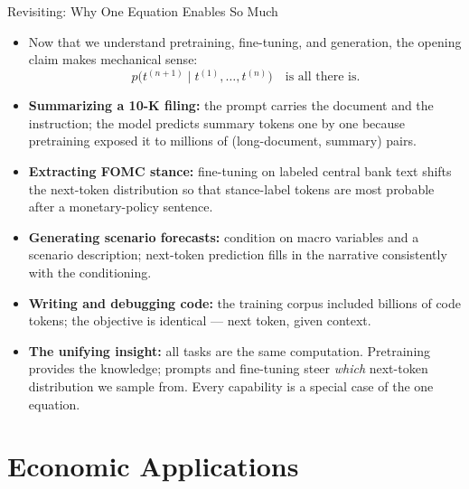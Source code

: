 \documentclass[10pt,english,aspectratio=169]{beamer}
\begin{document}
\begin{frame}{Revisiting: Why One Equation Enables So Much}
\begin{itemize}
\item Now that we understand pretraining, fine-tuning, and generation, the opening claim makes mechanical sense:
\[
   p\bigl(t^{(n+1)} \mid t^{(1)}, \ldots, t^{(n)}\bigr) \quad \text{is all there is.}
\]

\medskip
\item \textbf{Summarizing a 10-K filing:} the prompt carries the document and the instruction; the model predicts summary tokens one by one because pretraining exposed it to millions of (long-document, summary) pairs.

\medskip
\item \textbf{Extracting FOMC stance:} fine-tuning on labeled central bank text shifts the next-token distribution so that stance-label tokens are most probable after a monetary-policy sentence.

\medskip
\item \textbf{Generating scenario forecasts:} condition on macro variables and a scenario description; next-token prediction fills in the narrative consistently with the conditioning.

\medskip
\item \textbf{Writing and debugging code:} the training corpus included billions of code tokens; the objective is identical --- next token, given context.

\medskip
\item \textbf{The unifying insight:} all tasks are the same computation. Pretraining provides the knowledge; prompts and fine-tuning steer \emph{which} next-token distribution we sample from. Every capability is a special case of the one equation.
\end{itemize}
\end{frame}

\section{Economic Applications}
\end{document}
